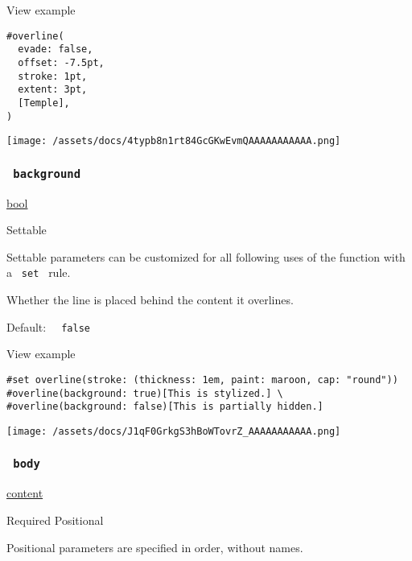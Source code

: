 
View example

\begin{verbatim}
#overline(
  evade: false,
  offset: -7.5pt,
  stroke: 1pt,
  extent: 3pt,
  [Temple],
)
\end{verbatim}

\texttt{[image: /assets/docs/4typb8n1rt84GcGKwEvmQAAAAAAAAAAA.png]}

\subsubsection{\texorpdfstring{\texttt{\ background\ }}{ background }}\label{parameters-background}

\href{/docs/reference/foundations/bool/}{bool}

{{ Settable }}

\label{parameters-background-settable-tooltip}
Settable parameters can be customized for all following uses of the
function with a \texttt{\ set\ } rule.

Whether the line is placed behind the content it overlines.

Default: \texttt{\ }{\texttt{\ false\ }}\texttt{\ }


View example

\begin{verbatim}
#set overline(stroke: (thickness: 1em, paint: maroon, cap: "round"))
#overline(background: true)[This is stylized.] \
#overline(background: false)[This is partially hidden.]
\end{verbatim}

\texttt{[image: /assets/docs/J1qF0GrkgS3hBoWTovrZ\_AAAAAAAAAAA.png]}

\subsubsection{\texorpdfstring{\texttt{\ body\ }}{ body }}\label{parameters-body}

\href{/docs/reference/foundations/content/}{content}

{Required} {{ Positional }}

\label{parameters-body-positional-tooltip}
Positional parameters are specified in order, without names.


